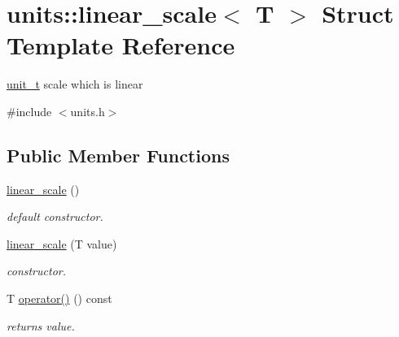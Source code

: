 \hypertarget{structunits_1_1linear__scale}{}\section{units\+:\+:linear\+\_\+scale$<$ T $>$ Struct Template Reference}
\label{structunits_1_1linear__scale}


\hyperlink{classunits_1_1unit__t}{unit\+\_\+t} scale which is linear  




{\ttfamily \#include $<$units.\+h$>$}

\subsection*{Public Member Functions}
\begin{DoxyCompactItemize}
\item 
\hypertarget{structunits_1_1linear__scale_ab430397b85087fffbc4771db727714e2}{}\hyperlink{structunits_1_1linear__scale_ab430397b85087fffbc4771db727714e2}{linear\+\_\+scale} ()\label{structunits_1_1linear__scale_ab430397b85087fffbc4771db727714e2}

\begin{DoxyCompactList}\small\item\em default constructor. \end{DoxyCompactList}\item 
\hypertarget{structunits_1_1linear__scale_af8140f9bd2dda5e37df222df26a6b030}{}\hyperlink{structunits_1_1linear__scale_af8140f9bd2dda5e37df222df26a6b030}{linear\+\_\+scale} (T value)\label{structunits_1_1linear__scale_af8140f9bd2dda5e37df222df26a6b030}

\begin{DoxyCompactList}\small\item\em constructor. \end{DoxyCompactList}\item 
\hypertarget{structunits_1_1linear__scale_a08f4eeb2aa5d9945c6ad560694ae379f}{}T \hyperlink{structunits_1_1linear__scale_a08f4eeb2aa5d9945c6ad560694ae379f}{operator()} () const \label{structunits_1_1linear__scale_a08f4eeb2aa5d9945c6ad560694ae379f}

\begin{DoxyCompactList}\small\item\em returns value. \end{DoxyCompactList}\end{DoxyCompactItemize}
